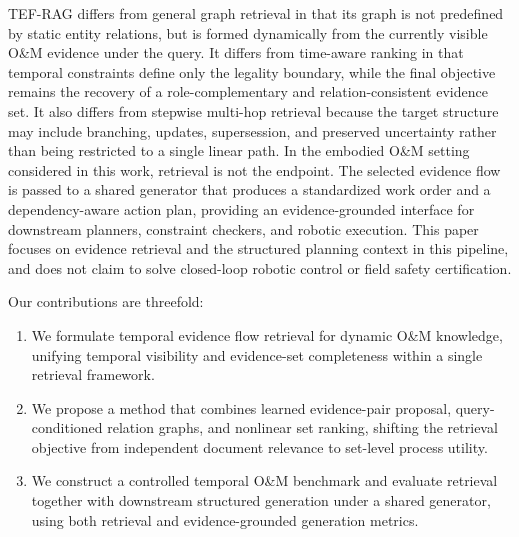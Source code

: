 TEF-RAG differs from general graph retrieval in that its graph is not predefined by static entity relations, but is formed dynamically from the currently visible O\&M evidence under the query. It differs from time-aware ranking in that temporal constraints define only the legality boundary, while the final objective remains the recovery of a role-complementary and relation-consistent evidence set. It also differs from stepwise multi-hop retrieval because the target structure may include branching, updates, supersession, and preserved uncertainty rather than being restricted to a single linear path.
In the embodied O\&M setting considered in this work, retrieval is not the endpoint. The selected evidence flow is passed to a shared generator that produces a standardized work order and a dependency-aware action plan, providing an evidence-grounded interface for downstream planners, constraint checkers, and robotic execution. This paper focuses on evidence retrieval and the structured planning context in this pipeline, and does not claim to solve closed-loop robotic control or field safety certification.

Our contributions are threefold:
\begin{enumerate}
    \item We formulate temporal evidence flow retrieval for dynamic O\&M knowledge, unifying temporal visibility and evidence-set completeness within a single retrieval framework.
    \item We propose a method that combines learned evidence-pair proposal, query-conditioned relation graphs, and nonlinear set ranking, shifting the retrieval objective from independent document relevance to set-level process utility.
    \item We construct a controlled temporal O\&M benchmark and evaluate retrieval together with downstream structured generation under a shared generator, using both retrieval and evidence-grounded generation metrics.
\end{enumerate}


